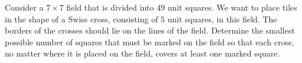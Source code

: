 Consider a $7 \times 7$ field that is divided into $49$ unit squares.
We want to place tiles in the shape of a Swiss cross, consisting of $5$ unit squares, in this field.
The borders of the crosses should lie on the lines of the field.
Determine the smallest possible number of squares that must be marked on the field so
that each cross, no matter where it is placed on the field, covers at least one marked square.